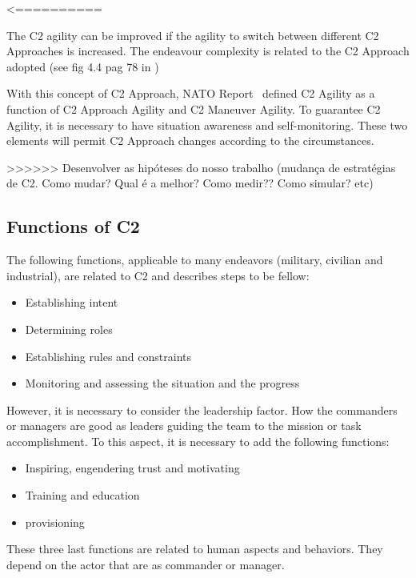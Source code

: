 <==========

The C2 agility can be improved if the agility to switch between different C2 Approaches is increased. The endeavour complexity is related to the C2 Approach adopted (see fig 4.4 pag 78 in \cite{FRANCE2014})

With this concept of C2 Approach, NATO Report~\cite{FRANCE2014} defined C2 Agility as a function of C2 Approach Agility and C2 Maneuver Agility. To guarantee C2 Agility, it is necessary to have situation awareness and self-monitoring. These two elements will permit C2 Approach changes according to the circumstances.




>>>>>> Desenvolver as hipóteses do nosso trabalho (mudança de estratégias de C2. Como mudar? Qual é a melhor? Como medir?? Como simular? etc)




\subsection {Functions of C2}

The following functions, applicable to many endeavors (military, civilian and industrial), are related to C2 and describes steps to be fellow:
\begin{itemize}
    \item Establishing intent
    \item Determining roles
    \item Establishing rules and constraints
    \item Monitoring and assessing the situation and the progress
\end{itemize}

However, it is necessary to consider the leadership factor. How the commanders or managers are good as leaders guiding the team to the mission or task accomplishment. To this aspect, it is necessary to add the following functions:

\begin{itemize}
    \item Inspiring, engendering trust and motivating
    \item Training and education
    \item provisioning
\end{itemize}

These three last functions are related to human aspects and behaviors. They depend on the actor that are as commander or manager.


